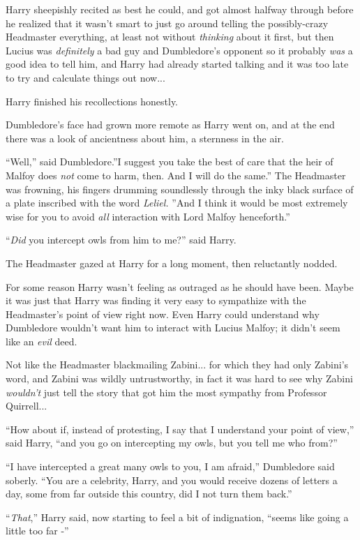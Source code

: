 Harry sheepishly recited as best he could, and got almost halfway
through before he realized that it wasn't smart to just go around
telling the possibly-crazy Headmaster everything, at least not without
\emph{thinking} about it first, but then Lucius was \emph{definitely} a
bad guy and Dumbledore's opponent so it probably \emph{was} a good idea
to tell him, and Harry had already started talking and it was too late
to try and calculate things out now...

Harry finished his recollections honestly.

Dumbledore's face had grown more remote as Harry went on, and at the end
there was a look of ancientness about him, a sternness in the air.

``Well,'' said Dumbledore.''I suggest you take the best of care that the
heir of Malfoy does \emph{not} come to harm, then. And I will do the
same.'' The Headmaster was frowning, his fingers drumming soundlessly
through the inky black surface of a plate inscribed with the word
\emph{Leliel.} ''And I think it would be most extremely wise for you to
avoid \emph{all} interaction with Lord Malfoy henceforth.''

``\emph{Did} you intercept owls from him to me?'' said Harry.

The Headmaster gazed at Harry for a long moment, then reluctantly
nodded.

For some reason Harry wasn't feeling as outraged as he should have been.
Maybe it was just that Harry was finding it very easy to sympathize with
the Headmaster's point of view right now. Even Harry could understand
why Dumbledore wouldn't want him to interact with Lucius Malfoy; it
didn't seem like an \emph{evil} deed.

Not like the Headmaster blackmailing Zabini... for which they had
only Zabini's word, and Zabini was wildly untrustworthy, in fact it was
hard to see why Zabini \emph{wouldn't} just tell the story that got him
the most sympathy from Professor Quirrell...

``How about if, instead of protesting, I say that I understand your
point of view,'' said Harry, ``and you go on intercepting my owls, but
you tell me who from?''

``I have intercepted a great many owls to you, I am afraid,'' Dumbledore
said soberly. ``You are a celebrity, Harry, and you would receive dozens
of letters a day, some from far outside this country, did I not turn
them back.''

``\emph{That},'' Harry said, now starting to feel a bit of indignation,
``seems like going a little too far -''


